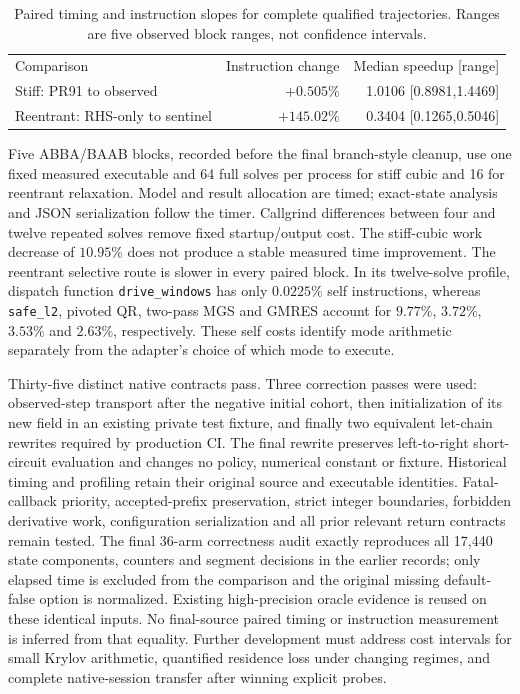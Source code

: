 \begin{table}[tb]
\caption{Paired timing and instruction slopes for complete qualified
trajectories. Ranges are five observed block ranges, not confidence intervals.}
\label{tab:production-adapter-profile}
\begin{ruledtabular}
\begin{tabular}{lrr}
Comparison &Instruction change&Median speedup [range]\\
Stiff: PR91 to observed & $+0.505\%$ &1.0106 [0.8981,1.4469]\\
Reentrant: RHS-only to sentinel &$+145.02\%$&0.3404 [0.1265,0.5046]
\end{tabular}
\end{ruledtabular}
\end{table}

Five ABBA/BAAB blocks, recorded before the final branch-style cleanup, use
one fixed measured executable and 64 full solves per process for stiff cubic and 16
for reentrant relaxation. Model and result allocation are timed; exact-state
analysis and JSON serialization follow the timer. Callgrind differences
between four and twelve repeated solves remove fixed startup/output cost.
The stiff-cubic work decrease of $10.95\%$ does not produce a stable measured
time improvement. The reentrant selective route is slower in every paired
block. In its twelve-solve profile, dispatch function
\texttt{drive\_windows} has only $0.0225\%$ self instructions, whereas
\texttt{safe\_l2}, pivoted QR, two-pass MGS and GMRES account for
$9.77\%$, $3.72\%$, $3.53\%$ and $2.63\%$, respectively. These self costs
identify mode arithmetic separately from the adapter's choice of which
mode to execute.

Thirty-five distinct native contracts pass. Three correction passes were used:
observed-step transport after the negative initial cohort, then initialization
of its new field in an existing private test fixture, and finally two equivalent
let-chain rewrites required by production CI. The final rewrite preserves
left-to-right short-circuit evaluation and changes no policy, numerical
constant or fixture. Historical timing and profiling retain their original
source and executable identities. Fatal-callback priority,
accepted-prefix preservation, strict integer boundaries, forbidden derivative
work, configuration serialization and all prior relevant return contracts
remain tested. The final 36-arm correctness audit exactly reproduces all
17,440 state components, counters and segment decisions in the earlier
records; only elapsed time is excluded from the comparison and the original
missing default-false option is normalized. Existing high-precision oracle
evidence is reused on these identical inputs. No final-source paired timing
or instruction measurement is inferred from that equality. Further
development must address cost intervals for small
Krylov arithmetic, quantified residence loss under changing regimes, and
complete native-session transfer after winning explicit probes.
